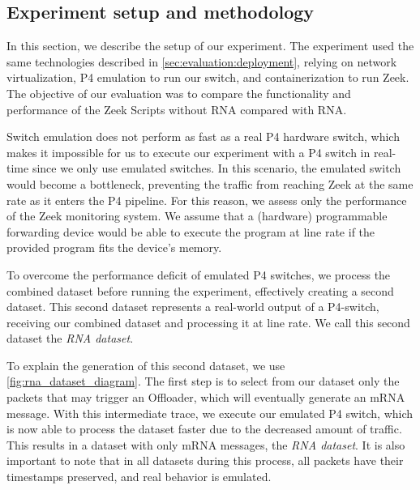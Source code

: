 


\subsection{Experiment setup and methodology}
\label{sec:evaluation:setup}

In this section, we describe the setup of our experiment. The experiment used the same technologies described in \autoref{sec:evaluation:deployment}, relying on network virtualization, P4 emulation to run our switch, and containerization to run Zeek. The objective of our evaluation was to compare the functionality and performance of the Zeek Scripts without RNA compared with RNA.

Switch emulation does not perform as fast as a real P4 hardware switch, which makes it impossible for us to execute our experiment with a P4 switch in real-time since we only use emulated switches. In this scenario, the emulated switch would become a bottleneck, preventing the traffic from reaching Zeek at the same rate as it enters the P4 pipeline. For this reason, we assess only the performance of the Zeek monitoring system. We assume that a (hardware) programmable forwarding device would be able to execute the program at line rate if the provided program fits the device's memory.

\vspace{1em}

To overcome the performance deficit of emulated P4 switches, we process the combined dataset before running the experiment, effectively creating a second dataset. This second dataset represents a real-world output of a P4-switch, receiving our combined dataset and processing it at line rate. We call this second dataset the \textit{RNA dataset}.

To explain the generation of this second dataset, we use \autoref{fig:rna_dataset_diagram}. The first step is to select from our dataset only the packets that may trigger an Offloader, which will eventually generate an mRNA message. With this intermediate trace, we execute our emulated P4 switch, which is now able to process the dataset faster due to the decreased amount of traffic. This results in a dataset with only mRNA messages, the \textit{RNA dataset}. It is also important to note that in all datasets during this process, all packets have their timestamps preserved, and real behavior is emulated.

